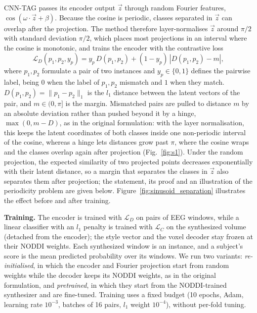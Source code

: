 \documentclass[10pt]{article}
\begin{document}
CNN-TAG passes its encoder output $\vec{z}$ through random Fourier features, $\cos(\omega\cdot\vec{z}+\beta)$. Because the cosine is periodic, classes separated in $\vec{z}$ can overlap after the projection. The method therefore layer-normalises \cite{ba2016layer} $\vec{z}$ around $\pi/2$ with standard deviation $\pi/2$, which places most projections in an interval where the cosine is monotonic, and trains the encoder with the contrastive loss
\begin{equation}\label{equation:contrastive}
    \mathcal{L}_D(p_1, p_2, y_p) = y_p\, D(p_1, p_2) + (1-y_p)\, \left| D(p_1,p_2)-m \right|,
\end{equation}
where $p_1, p_2$ formulate a pair of two instances and $y_p \in \{0,1\}$ defines the pairwise label, being $0$ when the label of $p_1, p_2$ mismatch and $1$ when they match. $D(p_1,p_2) = \|p_1-p_2\|_1$ is the $l_1$ distance between the latent vectors of the pair, and $m \in (0, \pi]$ is the margin. Mismatched pairs are pulled to distance $m$ by an absolute deviation rather than pushed beyond it by a hinge, $\max(0, m - D)$, as in the original formulation: with the layer normalisation, this keeps the latent coordinates of both classes inside one non-periodic interval of the cosine, whereas a hinge lets distances grow past $\pi$, where the cosine wraps and the classes overlap again after projection (Fig.~\ref{fig:s1}). Under the random projection, the expected similarity of two projected points decreases exponentially with their latent distance, so a margin that separates the classes in $\vec{z}$ also separates them after projection; the statement, its proof and an illustration of the periodicity problem are given below. Figure~\ref{fig:sinusoid_separation} illustrates the effect before and after training.

\noindent\textbf{Training.} The encoder is trained with $\mathcal{L}_D$ on pairs of EEG windows, while a linear classifier with an $l_1$ penalty is trained with $\mathcal{L}_C$ on the synthesized volume (detached from the encoder); the style vector and the voxel decoder stay frozen at their NODDI weights. Each synthesized window is an instance, and a subject's score is the mean predicted probability over its windows. We run two variants: \emph{re-initialised}, in which the encoder and Fourier projection start from random weights while the decoder keeps its NODDI weights, as in the original formulation, and \emph{pretrained}, in which they start from the NODDI-trained synthesizer and are fine-tuned. Training uses a fixed budget (10 epochs, Adam, learning rate $10^{-3}$, batches of 16 pairs, $l_1$ weight $10^{-4}$), without per-fold tuning.
\end{document}
